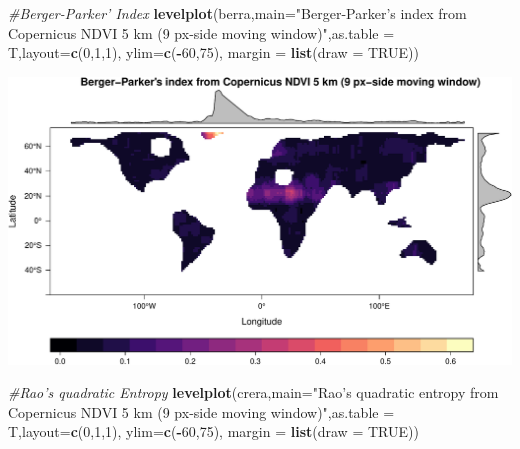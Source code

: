 \documentclass[
]{article}
\newenvironment{Shaded}{\begin{snugshade}}{\end{snugshade}}
\newcommand{\CommentTok}[1]{\textcolor[rgb]{0.56,0.35,0.01}{\textit{#1}}}
\newcommand{\DataTypeTok}[1]{\textcolor[rgb]{0.13,0.29,0.53}{#1}}
\newcommand{\DecValTok}[1]{\textcolor[rgb]{0.00,0.00,0.81}{#1}}
\newcommand{\KeywordTok}[1]{\textcolor[rgb]{0.13,0.29,0.53}{\textbf{#1}}}
\newcommand{\NormalTok}[1]{#1}
\newcommand{\OperatorTok}[1]{\textcolor[rgb]{0.81,0.36,0.00}{\textbf{#1}}}
\newcommand{\OtherTok}[1]{\textcolor[rgb]{0.56,0.35,0.01}{#1}}
\newcommand{\StringTok}[1]{\textcolor[rgb]{0.31,0.60,0.02}{#1}}
\begin{document}
\begin{Shaded}
\begin{Highlighting}[]
\CommentTok{#Berger-Parker' Index}
\KeywordTok{levelplot}\NormalTok{(berra,}\DataTypeTok{main=}\StringTok{"Berger-Parker's index from Copernicus NDVI 5 km (9 px-side moving window)"}\NormalTok{,}\DataTypeTok{as.table =}\NormalTok{ T,}\DataTypeTok{layout=}\KeywordTok{c}\NormalTok{(}\DecValTok{0}\NormalTok{,}\DecValTok{1}\NormalTok{,}\DecValTok{1}\NormalTok{), }\DataTypeTok{ylim=}\KeywordTok{c}\NormalTok{(}\OperatorTok{-}\DecValTok{60}\NormalTok{,}\DecValTok{75}\NormalTok{), }\DataTypeTok{margin =} \KeywordTok{list}\NormalTok{(}\DataTypeTok{draw =} \OtherTok{TRUE}\NormalTok{))}
\end{Highlighting}
\end{Shaded}

\begin{center}\includegraphics[width=0.95\linewidth]{vignettes_rasterdiv_files/figure-latex/fig04-1} \end{center}

\begin{Shaded}
\begin{Highlighting}[]
\CommentTok{#Rao's quadratic Entropy}
\KeywordTok{levelplot}\NormalTok{(crera,}\DataTypeTok{main=}\StringTok{"Rao's quadratic entropy from Copernicus NDVI 5 km (9 px-side moving window)"}\NormalTok{,}\DataTypeTok{as.table =}\NormalTok{ T,}\DataTypeTok{layout=}\KeywordTok{c}\NormalTok{(}\DecValTok{0}\NormalTok{,}\DecValTok{1}\NormalTok{,}\DecValTok{1}\NormalTok{), }\DataTypeTok{ylim=}\KeywordTok{c}\NormalTok{(}\OperatorTok{-}\DecValTok{60}\NormalTok{,}\DecValTok{75}\NormalTok{), }\DataTypeTok{margin =} \KeywordTok{list}\NormalTok{(}\DataTypeTok{draw =} \OtherTok{TRUE}\NormalTok{))}
\end{Highlighting}
\end{Shaded}
\end{document}
